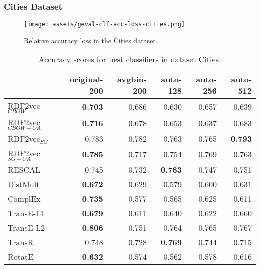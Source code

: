 \documentclass[11pt,titlepage,oneside,openany]{book}
\begin{document}
\newpage

\subsubsection{Cities Dataset}
\label{subsubsec:geval-results-clf-cities}

\begin{figure}[H]
    \centering
    \texttt{[image: assets/geval-clf-acc-loss-cities.png]}
    \vspace*{-3mm}
    \caption{Relative accuracy loss in the Cities dataset.}
    \label{fig:geval-clf-acc-loss-cities}
\end{figure}


\begin{table}[h!]
\centering
\begin{tabular}{lrrrrr}
\toprule
{} &  original-200 &  avgbin-200 &  auto-128 &  auto-256 &  auto-512 \\
\midrule
RDF2vec$_{CBOW}$     &	\textbf{0.703} &       0.686  &     0.630  &     0.657  &     0.639  \\
RDF2vec$_{CBOW-OA}$  &	\textbf{0.716} &       0.678  &     0.653  &     0.637  &     0.683  \\
RDF2vec$_{SG}$       &         0.783  &       0.782  &     0.763  &     0.765  &	\textbf{0.793} \\
RDF2vec$_{SG-OA}$    &	\textbf{0.785} &       0.717  &     0.754  &     0.769  &     0.763  \\
RESCAL               &         0.745  &       0.732  &	\textbf{0.763} &     0.747  &     0.751  \\
DistMult             &	\textbf{0.672} &       0.629  &     0.579  &     0.600  &     0.631  \\
ComplEx              &	\textbf{0.735} &       0.577  &     0.565  &     0.625  &     0.611  \\
TransE-L1            &	\textbf{0.679} &       0.611  &     0.640  &     0.622  &     0.660  \\
TransE-L2            &	\textbf{0.806} &       0.751  &     0.764  &     0.765  &     0.767  \\
TransR               &         0.748  &       0.728  &	\textbf{0.769} &     0.744  &     0.715  \\
RotatE               &	\textbf{0.632} &       0.574  &     0.562  &     0.578  &     0.616  \\
\bottomrule
\end{tabular}
\caption{Accuracy scores for best classifiers in dataset Cities.}
\label{tab:geval-clf-acc-cities}
\end{table}
\end{document}
